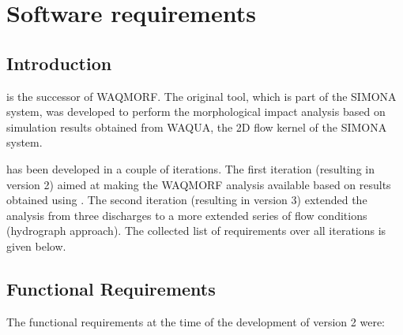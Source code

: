 \chapter{Software requirements}

\section{Introduction}

\dfastmi is the successor of WAQMORF.
The original tool, which is part of the SIMONA system, was developed to perform the morphological impact analysis based on simulation results obtained from WAQUA, the 2D flow kernel of the SIMONA system.

\dfmi has been developed in a couple of iterations.
The first iteration (resulting in version 2) aimed at making the WAQMORF analysis available based on results obtained using \dflowfm.
The second iteration (resulting in version 3) extended the analysis from three discharges to a more extended series of flow conditions (hydrograph approach).
The collected list of requirements over all iterations is given below.

\section{Functional Requirements} \label{Sec:FuncReq}

The functional requirements at the time of the development of \dfastmi version 2 were:

